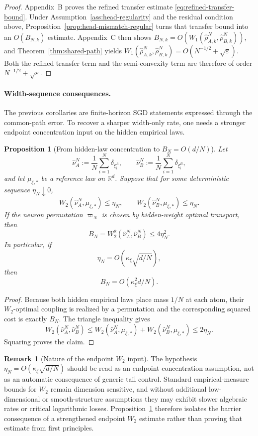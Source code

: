 \documentclass[11pt]{article}
\newtheorem{proposition}[theorem]{Proposition}
\theoremstyle{definition}
\newtheorem{remark}[theorem]{Remark}
\newcommand{\R}{\mathbb{R}}
\begin{document}
\begin{proof}
Appendix~B proves the refined transfer estimate
\eqref{eq:refined-transfer-bound}. Under Assumption~\ref{ass:head-regularity}
and the residual condition above, Proposition~\ref{prop:head-mismatch-regular}
turns that transfer bound into an $O(B_{N,k})$ estimate. Appendix~C then
shows $B_{N,k}=O(W_1(\hat\rho_{A,k}^N,\hat\rho_{B,k}^N))$, and
Theorem~\ref{thm:shared-path} yields
$W_1(\hat\rho_{A,k}^N,\hat\rho_{B,k}^N)=O(N^{-1/2}+\sqrt{\varepsilon})$.
Both the refined transfer term and the semi-convexity term are therefore of
order $N^{-1/2}+\sqrt{\varepsilon}$.
\end{proof}

\paragraph{Width-sequence consequences.}

The previous corollaries are finite-horizon SGD statements expressed through
the common-path error. To recover a sharper width-only rate, one needs a
stronger endpoint concentration input on the hidden empirical laws.

\begin{proposition}[From hidden-law concentration to $B_N=O(d/N)$]
\label{prop:BN-from-w2}
Let
\[
  \hat\nu_A^N:=\frac1N\sum_{i=1}^N \delta_{\xi_i^A},
  \qquad
  \hat\nu_B^N:=\frac1N\sum_{i=1}^N \delta_{\xi_i^B},
\]
and let $\mu_{\xi,\ast}$ be a reference law on $\R^d$. Suppose that for some
deterministic sequence $\eta_N\downarrow 0$,
\[
  W_2(\hat\nu_A^N,\mu_{\xi,\ast})\le \eta_N,
  \qquad
  W_2(\hat\nu_B^N,\mu_{\xi,\ast})\le \eta_N.
\]
If the neuron permutation $\varpi_N$ is chosen by hidden-weight optimal
transport, then
\[
  B_N=W_2^2(\hat\nu_A^N,\hat\nu_B^N)\le 4\eta_N^2.
\]
In particular, if
\[
  \eta_N=O(\kappa_\xi\sqrt{d/N}),
\]
then
\[
  B_N=O(\kappa_\xi^2 d/N).
\]
\end{proposition}

\begin{proof}
Because both hidden empirical laws place mass $1/N$ at each atom, their
$W_2$-optimal coupling is realized by a permutation and the corresponding
squared cost is exactly $B_N$. The triangle inequality gives
\[
  W_2(\hat\nu_A^N,\hat\nu_B^N)
  \le
  W_2(\hat\nu_A^N,\mu_{\xi,\ast})+W_2(\hat\nu_B^N,\mu_{\xi,\ast})
  \le
  2\eta_N.
\]
Squaring proves the claim.
\end{proof}

\begin{remark}[Nature of the endpoint $W_2$ input]
The hypothesis $\eta_N=O(\kappa_\xi\sqrt{d/N})$ should be read as an endpoint
concentration assumption, not as an automatic consequence of generic tail
control. Standard empirical-measure bounds for $W_2$ remain dimension
sensitive, and without additional low-dimensional or smooth-structure
assumptions they may exhibit slower algebraic rates or critical logarithmic
losses. Proposition~\ref{prop:BN-from-w2} therefore isolates the barrier
consequence of a strengthened endpoint $W_2$ estimate rather than proving that
estimate from first principles.
\end{remark}
\end{document}
